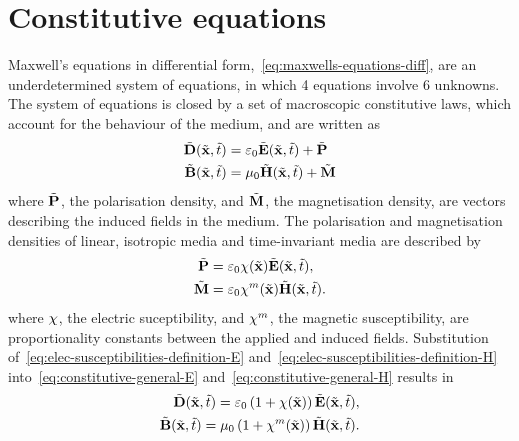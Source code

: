 \section{Constitutive equations}
\label{Ch:PhysicalProblem:ConstitutiveEquations}
Maxwell's equations in differential form,~\eqref{eq:maxwells-equations-diff},
are an underdetermined system of equations, in which 4 equations involve 6 unknowns. The
system of equations is closed by a set of macroscopic constitutive laws, which
account for the behaviour of the medium, and are written as
\begin{subequations}
  \begin{align}
    \tilde{\mathbf{D}}(\tilde{\mathbf{x}},\tilde{t}) &= \varepsilon_0 \tilde{\mathbf{E}}(\tilde{\mathbf{x}},\tilde{t}) + \tilde{\mathbf{P}}  \label{eq:constitutive-general-E}\\
    \tilde{\mathbf{B}}(\tilde{\mathbf{x}},\tilde{t}) &= \mu_0 \tilde{\mathbf{H}}(\tilde{\mathbf{x}},\tilde{t}) + \tilde{\mathbf{M}} \label{eq:constitutive-general-H}
  \end{align}
\end{subequations}
where $\tilde{\mathbf{P}}$, the polarisation density, and $\tilde{\mathbf{M}}$, the magnetisation density, are vectors describing the induced fields in the medium.
The polarisation and magnetisation densities of linear, isotropic media and time-invariant media are described by
\begin{subequations}
  \begin{align}
    \tilde{\mathbf{P}} &= \varepsilon_0 \chi(\tilde{\mathbf{x}}) \tilde{\mathbf{E}}(\tilde{\mathbf{x}},\tilde{t}), \label{eq:elec-susceptibilities-definition-E} \\
    \tilde{\mathbf{M}} &= \varepsilon_0 \chi^{m}(\tilde{\mathbf{x}}) \tilde{\mathbf{H}}(\tilde{\mathbf{x}},\tilde{t}) . \label{eq:elec-susceptibilities-definition-H} 
  \end{align}
\end{subequations}
where $\chi$, the electric suceptibility, and $\chi^{m}$, the magnetic susceptibility, are proportionality constants between the applied and induced fields. Substitution of~\eqref{eq:elec-susceptibilities-definition-E} and~\eqref{eq:elec-susceptibilities-definition-H} into~\eqref{eq:constitutive-general-E} and~\eqref{eq:constitutive-general-H} results in
\begin{subequations}
  \begin{align}
    \tilde{\mathbf{D}}(\tilde{\mathbf{x}},\tilde{t}) = \varepsilon_0 \left( 1 + \chi(\tilde{\mathbf{x}})  \right) \tilde{\mathbf{E}}(\tilde{\mathbf{x}},\tilde{t}), \\
    \tilde{\mathbf{B}}(\tilde{\mathbf{x}},\tilde{t}) = \mu_0  \left( 1 + \chi^{m}(\tilde{\mathbf{x}}) \right)  \tilde{\mathbf{H}}(\tilde{\mathbf{x}},\tilde{t}).
  \end{align}
\end{subequations}

